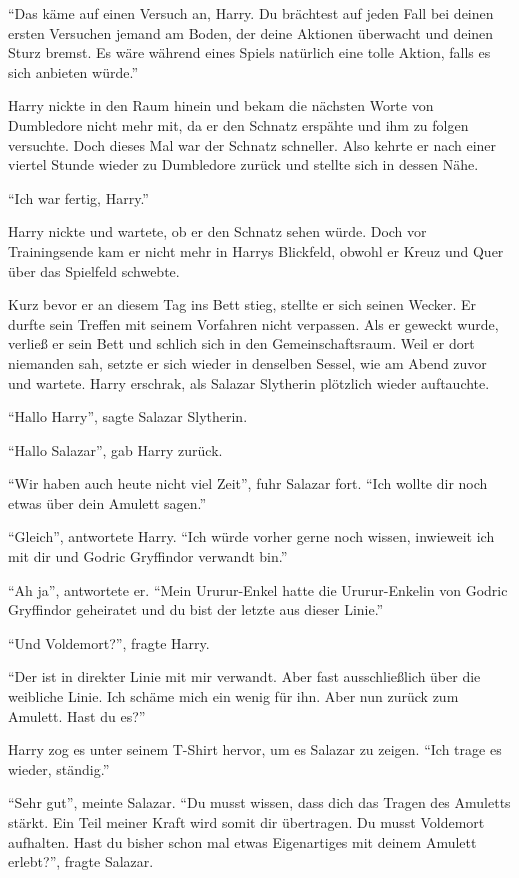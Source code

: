 \enquote{Das käme auf einen Versuch an, Harry. Du brächtest auf jeden Fall bei deinen ersten Versuchen jemand am Boden, der deine Aktionen überwacht und deinen Sturz bremst. Es wäre während eines Spiels natürlich eine tolle Aktion, \gst falls es sich anbieten würde.}

Harry nickte in den Raum hinein und bekam die nächsten Worte von Dumbledore nicht mehr mit, da er den Schnatz erspähte und ihm zu folgen versuchte. Doch dieses Mal war der Schnatz schneller. Also kehrte er nach einer viertel Stunde wieder zu Dumbledore zurück und stellte sich in dessen Nähe.

\enquote{Ich war fertig, Harry.}

Harry nickte und wartete, ob er den Schnatz sehen würde. Doch vor Trainingsende kam er nicht mehr in Harrys Blickfeld, obwohl er Kreuz und Quer über das Spielfeld schwebte.

Kurz bevor er an diesem Tag ins Bett stieg, stellte er sich seinen Wecker. Er durfte sein Treffen mit seinem Vorfahren nicht verpassen. Als er geweckt wurde, verließ er sein Bett und schlich sich in den Gemeinschaftsraum. Weil er dort niemanden sah, setzte er sich wieder in denselben Sessel, wie am Abend zuvor und wartete. Harry erschrak, als Salazar Slytherin plötzlich wieder auftauchte.

\enquote{Hallo Harry}, sagte Salazar Slytherin.

\enquote{Hallo Salazar}, gab Harry zurück.

\enquote{Wir haben auch heute nicht viel Zeit}, fuhr Salazar fort. \enquote{Ich wollte dir noch etwas über dein Amulett sagen.}

\enquote{Gleich}, antwortete Harry. \enquote{Ich würde vorher gerne noch wissen, inwieweit ich mit dir und Godric Gryffindor verwandt bin.}

\enquote{Ah ja}, antwortete er. \enquote{Mein Ururur-Enkel hatte die Ururur-Enkelin von Godric Gryffindor geheiratet und du bist der letzte aus dieser Linie.}

\enquote{Und Voldemort?}, fragte Harry.

\enquote{Der ist in direkter Linie mit mir verwandt. Aber fast ausschließlich über die weibliche Linie. Ich schäme mich ein wenig für ihn. \gst Aber nun zurück zum Amulett. Hast du es?}

Harry zog es unter seinem T-Shirt hervor, um es Salazar zu zeigen. \enquote{Ich trage es wieder, ständig.}

\enquote{Sehr gut}, meinte Salazar. \enquote{Du musst wissen, dass dich das Tragen des Amuletts stärkt. Ein Teil meiner Kraft wird somit dir übertragen. Du musst Voldemort aufhalten. \gst Hast du bisher schon mal etwas Eigenartiges mit deinem Amulett erlebt?}, fragte Salazar.

